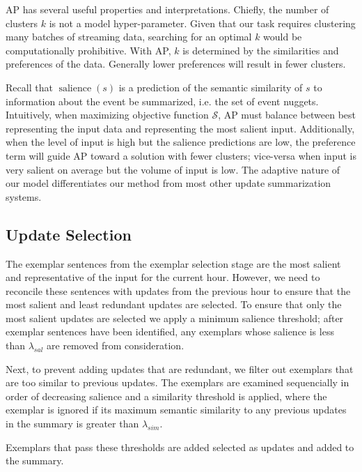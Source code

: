 
AP has several useful properties and interpretations. Chiefly, the number
of clusters $k$ is not a model hyper-parameter. Given that our task requires
clustering many batches of streaming data, searching for an optimal $k$ 
would be computationally prohibitive. With AP, $k$ is determined by the
similarities and preferences of the data. Generally lower preferences will
result in fewer clusters.  


Recall that $\operatorname{salience}(s)$
is a prediction of the semantic similarity of $s$ to information about the 
event be summarized, i.e. the set of event nuggets.
Intuitively, when maximizing objective function $\mathcal{S}$, AP must balance
between best representing the input data and representing the most salient
input. Additionally, when the level of input is high but the salience
predictions are low, the preference term will guide AP toward a solution
with fewer clusters; vice-versa when input is very salient on average but
the volume of input is low. The adaptive nature of our model differentiates
our method from most other update summarization systems.




\subsection{Update Selection}
\label{sec:upsel}

The exemplar sentences from the exemplar selection stage are the most 
salient and representative of the input for the current hour. However,
we need to reconcile these sentences with updates from the previous hour
to ensure that the most salient and least redundant  updates are selected.
To 
ensure that only the most salient updates are selected we apply a minimum
salience threshold;
after exemplar sentences have been identified, any exemplars whose salience is 
less than $\lambda_{sal}$ are removed from consideration. 

 Next,
to prevent adding updates that are redundant, we filter out exemplars
that are too similar to previous updates.
The exemplars are examined
sequencially in order of decreasing salience and  a similarity threshold 
is applied, where the exemplar is ignored if its
maximum semantic similarity to any previous updates in the summary is
greater than $\lambda_{sim}$.

Exemplars that pass these thresholds are added selected as updates and added
to the summary.




